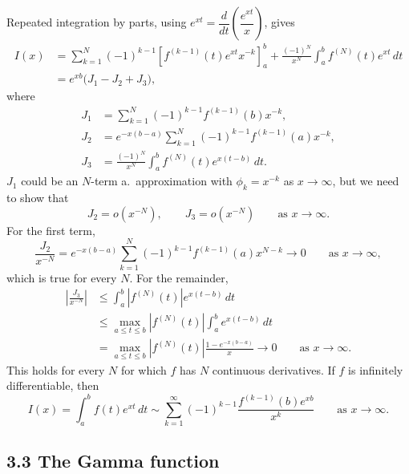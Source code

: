 \documentclass[11pt,a4paper]{article}
\begin{document}
Repeated integration by parts, using
$e^{xt}=\dfrac{d}{dt}\left(\dfrac{e^{xt}}{x}\right)$, gives
\begin{align*}
    I(x)
    &=\sum_{k=1}^N(-1)^{k-1}
      \left[f^{(k-1)}(t)e^{xt}x^{-k}\right]_a^b
      +\frac{(-1)^N}{x^N}\int_a^b f^{(N)}(t)e^{xt}\,dt\\
    &=e^{xb}\bigl(J_1-J_2+J_3\bigr),
\end{align*}
where
\begin{align*}
    J_1&=\sum_{k=1}^N(-1)^{k-1}f^{(k-1)}(b)x^{-k},\\
    J_2&=e^{-x(b-a)}
         \sum_{k=1}^N(-1)^{k-1}f^{(k-1)}(a)x^{-k},\\
    J_3&=\frac{(-1)^N}{x^N}
         \int_a^b f^{(N)}(t)e^{x(t-b)}\,dt.
\end{align*}
$J_1$ could be an $N$-term a.\ approximation with $\phi_k=x^{-k}$
as $x\to\infty$, but we need to show that
\[
    J_2=o(x^{-N}),
    \qquad J_3=o(x^{-N})
    \qquad\text{as }x\to\infty.
\]
For the first term,
\[
    \frac{J_2}{x^{-N}}
    =e^{-x(b-a)}
      \sum_{k=1}^N(-1)^{k-1}f^{(k-1)}(a)x^{N-k}
    \longrightarrow0
    \qquad\text{as }x\to\infty,
\]
which is true for every $N$. For the remainder,
\begin{align*}
    \left|\frac{J_3}{x^{-N}}\right|
    &\leq\int_a^b |f^{(N)}(t)|e^{x(t-b)}\,dt\\
    &\leq\max_{a\leq t\leq b}|f^{(N)}(t)|
          \int_a^b e^{x(t-b)}\,dt\\
    &=\max_{a\leq t\leq b}|f^{(N)}(t)|
      \frac{1-e^{-x(b-a)}}{x}
      \longrightarrow0
      \qquad\text{as }x\to\infty.
\end{align*}
This holds for every $N$ for which $f$ has $N$ continuous derivatives.
If $f$ is infinitely differentiable, then
\[
    I(x)=\int_a^b f(t)e^{xt}\,dt
    \sim\sum_{k=1}^\infty
    (-1)^{k-1}\frac{f^{(k-1)}(b)e^{xb}}{x^k}
    \qquad\text{as }x\to\infty.
\]

\subsection*{3.3 The Gamma function}
\end{document}
